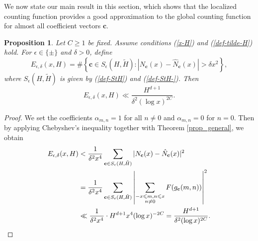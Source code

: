 \documentclass[reqno, 11pt]{amsart}
\renewcommand{\leq}{\leqslant}
\renewcommand{\geq}{\geqslant}
\newtheorem{prop}[theorem]{Proposition}
\theoremstyle{definition}
\theoremstyle{definition}
\renewcommand{\geq}{\geqslant}
\renewcommand{\leq}{\leqslant}
\newcommand{\eps}{\varepsilon}
\newcommand{\AAA}{\mathbb{A}}
\newcommand{\cc}{\mathbf{c}}
\newcommand{\xx}{\mathbf{x}}
\newcommand{\ZZ}{\mathbb{Z}}
\newcommand{\NNN}{\mathbf{N}}
\numberwithin{equation}{section}
\begin{document}
We now state our main result in this section, which shows that the localized counting function provides a good approximation to the global counting function for almost all coefficient vectors $\cc$.
\begin{prop}\label{cha-2moment}
	Let $C \geq 1$ be fixed. Assume conditions (\ref{x-H}) and (\ref{def-tilde-H}) hold. For $\epsilon \in \{ \pm\}$ and $\delta > 0$, define
	$$ E_{\epsilon, \delta}(x, H) = \# \left\{ \cc \in S_\epsilon(H, \tilde{H}): |N_\cc(x) - \hat{N}_\cc(x)| > \delta x^2 \right\},$$
	where $S_\epsilon(H, \tilde{H})$ is given by (\ref{def-StH}) and (\ref{def-StH-}). 
	Then
	$$E_{\epsilon, \delta}(x, H) \ll \frac{H^{d+1}}{\delta^2(\log x)^{2C}}. $$
\end{prop}
\begin{proof}
	We set the coefficients $\alpha_{m, n} = 1$ for all $n \neq 0$ and $\alpha_{m, n} = 0$ for $n = 0$. Then by applying Chebyshev's inequality together with Theorem \ref{prop_general}, we obtain
	\begin{align*}
		E_{\epsilon, \delta}(x, H) & < \frac{1}{\delta^2 x^4} \sum_{\cc \in S_\epsilon(H, \tilde{H})} |N_\cc(x) - \hat{N}_\cc(x)|^2 \\
		& = \frac{1}{\delta^2 x^4} \sum_{\cc \in S_\epsilon(H, \tilde{H})} \left| \sum_{\substack{-x \leq m,n \leq x \\ n \neq 0}} F(g_\cc(m,n)) \right|^2  \\ 
		& \ll \frac{1}{\delta^2 x^4} \cdot H^{d+1} x^4 (\log x)^{-2C} = \frac{H^{d+1}}{\delta^2(\log x)^{2C}}.\qedhere
	\end{align*}
\end{proof}



\end{document}
